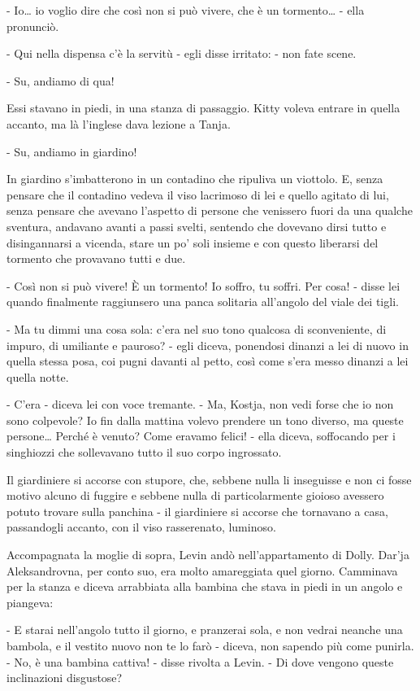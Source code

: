 - Io\ldots{} io voglio dire che così non si può vivere, che è un tormento\ldots{} - ella pronunciò. 

- Qui nella dispensa c'è la servitù - egli disse irritato: - non fate scene. 

- Su, andiamo di qua! 

Essi stavano in piedi, in una stanza di passaggio. Kitty voleva entrare in quella accanto, ma là l'inglese dava lezione a Tanja. 

- Su, andiamo in giardino! 

In giardino s'imbatterono in un contadino che ripuliva un viottolo. E, senza pensare che il contadino vedeva il viso lacrimoso di lei e quello agitato di lui, senza pensare che avevano l'aspetto di persone che venissero fuori da una qualche sventura, andavano avanti a passi svelti, sentendo che dovevano dirsi tutto e disingannarsi a vicenda, stare un po' soli insieme e con questo liberarsi del tormento che provavano tutti e due. 

- Così non si può vivere! È un tormento! Io soffro, tu soffri. Per cosa! - disse lei quando finalmente raggiunsero una panca solitaria all'angolo del viale dei tigli. 

- Ma tu dimmi una cosa sola: c'era nel suo tono qualcosa di sconveniente, di impuro, di umiliante e pauroso? - egli diceva, ponendosi dinanzi a lei di nuovo in quella stessa posa, coi pugni davanti al petto, così come s'era messo dinanzi a lei quella notte. 

- C'era - diceva lei con voce tremante. - Ma, Kostja, non vedi forse che io non sono colpevole? Io fin dalla mattina volevo prendere un tono diverso, ma queste persone\ldots{} Perché è venuto? Come eravamo felici! - ella diceva, soffocando per i singhiozzi che sollevavano tutto il suo corpo ingrossato. 

Il giardiniere si accorse con stupore, che, sebbene nulla li inseguisse e non ci fosse motivo alcuno di fuggire e sebbene nulla di particolarmente gioioso avessero potuto trovare sulla panchina - il giardiniere si accorse che tornavano a casa, passandogli accanto, con il viso rasserenato, luminoso. 

Accompagnata la moglie di sopra, Levin andò nell'appartamento di Dolly. Dar'ja Aleksandrovna, per conto suo, era molto amareggiata quel giorno. Camminava per la stanza e diceva arrabbiata alla bambina che stava in piedi in un angolo e piangeva: 

- E starai nell'angolo tutto il giorno, e pranzerai sola, e non vedrai neanche una bambola, e il vestito nuovo non te lo farò - diceva, non sapendo più come punirla. - No, è una bambina cattiva! - disse rivolta a Levin. - Di dove vengono queste inclinazioni disgustose? 

